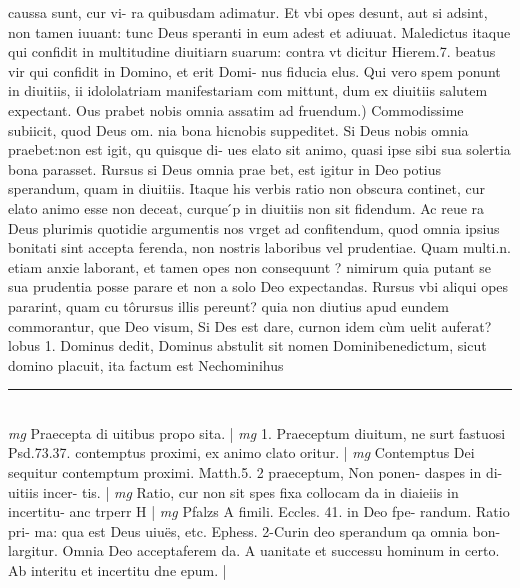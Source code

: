 \documentclass{article}
\begin{document}
\begin{pages}
caussa sunt, cur vi- ra quibusdam adimatur. Et vbi opes desunt, aut si adsint, non tamen iuuant: tunc Deus speranti in eum adest et adiuuat. Maledictus itaque qui confidit in multitudine diuitiarn suarum: contra vt dicitur Hierem.7. beatus vir qui confidit in Domino, et erit Domi- nus fiducia elus. Qui vero spem ponunt in diuitiis, ii idololatriam manifestariam com mittunt, dum ex diuitiis salutem expectant.  \pend\pstart Ous prabet nobis omnia assatim ad fruendum.) Commodissime subiicit, quod Deus om. nia bona hicnobis suppeditet. Si Deus nobis omnia praebet:non est igit, qu quisque di- ues elato sit animo, quasi ipse sibi sua solertia bona parasset. Rursus si Deus omnia prae bet, est igitur in Deo potius sperandum, quam in diuitiis. Itaque his verbis ratio non obscura continet, cur elato animo esse non deceat, curque ́p in diuitiis non sit fidendum. Ac reue ra Deus plurimis quotidie argumentis nos vrget ad confitendum, quod omnia ipsius bonitati sint accepta ferenda, non nostris laboribus vel prudentiae. Quam multi.n. etiam anxie laborant, et tamen opes non consequunt ? nimirum quia putant se sua prudentia posse parare et non a solo Deo expectandas. Rursus vbi aliqui opes pararint, quam cu tôrursus illis pereunt? quia non diutius apud eundem commorantur, que Deo visum, Si Des est dare, curnon idem cùm uelit auferat? lobus 1. Dominus dedit, Dominus abstulit sit nomen Dominibenedictum, sicut domino placuit, ita factum est Nechominihus  \pend
\vspace{0.5cm}\noindent
\vspace{0.2cm}\rule{1cm}{0.2pt}\\ 
\hspace{0.2cm}\textit{mg}
\footnotesize Praecepta di uitibus propo sita. 
\normalsize| 
\hspace{0.2cm}\textit{mg}
\footnotesize 1. Praeceptum diuitum, ne surt fastuosi Psd.73.37. contemptus proximi, ex animo clato oritur. 
\normalsize| 
\hspace{0.2cm}\textit{mg}
\footnotesize Contemptus Dei sequitur contemptum proximi. Matth.5. 2 praeceptum, Non ponen- daspes in di- uitiis incer- tis. 
\normalsize| 
\hspace{0.2cm}\textit{mg}
\footnotesize Ratio, cur non sit spes fixa collocam da in diaieiis in incertitu- anc trperr H 
\normalsize| 
\hspace{0.2cm}\textit{mg}
\footnotesize Pfalzs A fimili. Eccles. 41. in Deo fpe- randum. Ratio pri- ma: qua est Deus uiuës, etc. Ephess. 2-Curin deo sperandum qa omnia bon- largitur. Omnia Deo acceptaferem da. A uanitate et successu hominum in certo. Ab interitu et incertitu dne epum. 
\normalsize| 

\end{pages}
\end{document}
